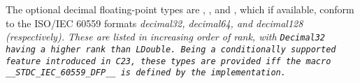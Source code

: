 The optional decimal floating-point types are , ,
and , which if available, conform to the ISO/IEC 60559
formats \it{decimal32}, \it{decimal64}, and \it{decimal128} (respectively).
These are listed in increasing order of rank,
with \tt{Decimal32} having a higher rank than \tt{LDouble}.
Being a conditionally supported feature introduced in C23,
these types are provided iff the macro \tt{__STDC_IEC_60559_DFP__}
is defined by the implementation.
